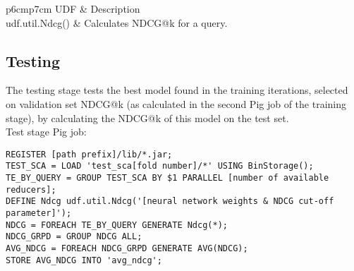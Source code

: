 \begin{table}
\centering
\begin{tabular}{p{6cm}p{7cm}}\toprule
UDF & Description \\
\midrule
udf.util.Ndcg() & Calculates \ac{NDCG}@k for a query.\\
\bottomrule
\end{tabular}
\caption{Description of training phase User Defined Functions (Pig job 2)}
\label{tbl:training_udfs_2}
\end{table}

\subsection{Testing}
The testing stage tests the best model found in the training iterations, selected on validation set \ac{NDCG}@k (as calculated in the second Pig job of the training stage), by calculating the \ac{NDCG}@k of this model on the test set.\\

Test stage Pig job:\\
\begin{minipage}{\linewidth}
\begin{lstlisting}
REGISTER [path prefix]/lib/*.jar;
TEST_SCA = LOAD 'test_sca[fold number]/*' USING BinStorage();
TE_BY_QUERY = GROUP TEST_SCA BY $1 PARALLEL [number of available reducers];
DEFINE Ndcg udf.util.Ndcg('[neural network weights & NDCG cut-off parameter]');
NDCG = FOREACH TE_BY_QUERY GENERATE Ndcg(*);
NDCG_GRPD = GROUP NDCG ALL;
AVG_NDCG = FOREACH NDCG_GRPD GENERATE AVG(NDCG);
STORE AVG_NDCG INTO 'avg_ndcg';
\end{lstlisting}
\end{minipage}\\